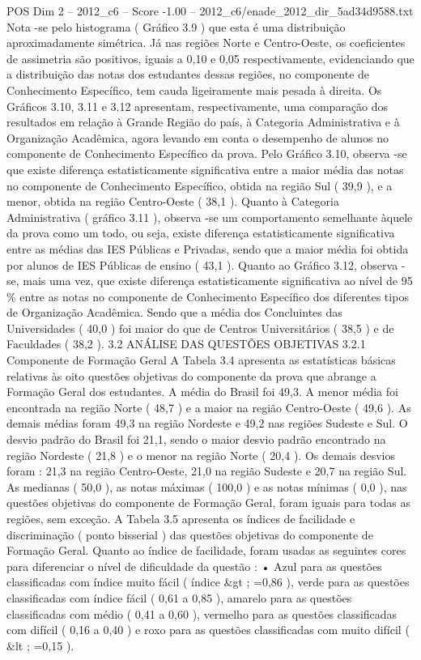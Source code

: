\begin{textsample}{POS Dim 2 – 2012\_c6 – Score -1.00 – 2012\_c6/enade\_2012\_dir\_5ad34d9588.txt}
Nota -se pelo histograma ( Gráfico 3.9 ) que esta é uma distribuição aproximadamente simétrica.
Já nas regiões Norte e Centro-Oeste, os coeficientes de assimetria são positivos, iguais a 0,10 e 0,05 respectivamente, evidenciando que a distribuição das notas dos estudantes dessas regiões, no componente de Conhecimento Específico, tem cauda ligeiramente mais pesada à direita.
Os Gráficos 3.10, 3.11 e 3.12 apresentam, respectivamente, uma comparação dos resultados em relação à Grande Região do país, à Categoria Administrativa e à Organização Acadêmica, agora levando em conta o desempenho de alunos no componente de Conhecimento Específico da prova.
Pelo Gráfico 3.10, observa -se que existe diferença estatisticamente significativa entre a maior média das notas no componente de Conhecimento Específico, obtida na região Sul ( 39,9 ), e a menor, obtida na região Centro-Oeste ( 38,1 ).
Quanto à Categoria Administrativa ( gráfico 3.11 ), observa -se um comportamento semelhante àquele da prova como um todo, ou seja, existe diferença estatisticamente significativa entre as médias das IES Públicas e Privadas, sendo que a maior média foi obtida por alunos de IES Públicas de ensino ( 43,1 ).
Quanto ao Gráfico 3.12, observa -se, mais uma vez, que existe diferença estatisticamente significativa ao nível de 95 \% entre as notas no componente de Conhecimento Específico dos diferentes tipos de Organização Acadêmica.
Sendo que a média dos Concluintes das Universidades ( 40,0 ) foi maior do que de Centros Universitários ( 38,5 ) e de Faculdades ( 38,2 ). 3.2 ANÁLISE DAS QUESTÕES OBJETIVAS 3.2.1 Componente de Formação Geral A Tabela 3.4 apresenta as estatísticas básicas relativas às oito questões objetivas do componente da prova que abrange a Formação Geral dos estudantes.
A média do Brasil foi 49,3.
A menor média foi encontrada na região Norte ( 48,7 ) e a maior na região Centro-Oeste ( 49,6 ).
As demais médias foram 49,3 na região Nordeste e 49,2 nas regiões Sudeste e Sul.
O desvio padrão do Brasil foi 21,1, sendo o maior desvio padrão encontrado na região Nordeste ( 21,8 ) e o menor na região Norte ( 20,4 ).
Os demais desvios foram : 21,3 na região Centro-Oeste, 21,0 na região Sudeste e 20,7 na região Sul.
As medianas ( 50,0 ), as notas máximas ( 100,0 ) e as notas mínimas ( 0,0 ), nas questões objetivas do componente de Formação Geral, foram iguais para todas as regiões, sem exceção.
A Tabela 3.5 apresenta os índices de facilidade e discriminação ( ponto bisserial ) das questões objetivas do componente de Formação Geral.
Quanto ao índice de facilidade, foram usadas as seguintes cores para diferenciar o nível de dificuldade da questão : • Azul para as questões classificadas com índice muito fácil ( índice \&gt ; =0,86 ), verde para as questões classificadas com índice fácil ( 0,61 a 0,85 ), amarelo para as questões classificadas com médio ( 0,41 a 0,60 ), vermelho para as questões classificadas com difícil ( 0,16 a 0,40 ) e roxo para as questões classificadas com muito difícil ( \&lt ; =0,15 ).

\end{textsample}
